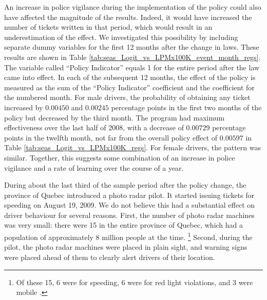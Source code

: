 An increase in police vigilance during the implementation of the policy 
could also have affected the magnitude of the results. 
Indeed, it would have increased the number of tickets written in that period, 
which would result in an underestimation of the effect. 
% 
% 
We investigated this possibility by including separate dummy variables
for the first 12 months after the change in laws. 
These results are shown in 
Table \ref{tab:seas_Logit_vs_LPMx100K_event_month_regs}. 
The variable called ``Policy Indicator'' equals 1 for the entire period after
the law came into effect. 
In each of the subsequent 12 months, the effect of the policy is measured 
as the sum of the ``Policy Indicator'' coefficient 
and the coefficient for the numbered month. 
% 
For male drivers, the probability of obtaining any ticket increased by 
$0.00450$ and $0.00245$ percentage points in the first two months of the policy
but decreased by the third month. 
The program had maximum effectiveness over the last half of 2008, 
with a decrease of $0.00729$ percentage points in the twelfth month, 
not far from the overall policy effect of $0.00597$ in 
Table \ref{tab:seas_Logit_vs_LPMx100K_regs}. 
% 
For female drivers, the pattern was similar. 
% 
Together, this suggests some combination of an increase in police vigilance 
and a rate of learning over the course of a year. 



During about the last third of the sample period after the policy change, 
the province of Quebec introduced a photo radar pilot. 
It started issuing tickets for speeding on August 19, 2009. 
We do not believe this had a substantial effect on driver behaviour for several reasons. 
First, the number of photo radar machines was very small: 
there were 15 in the entire province of Quebec, 
which had a population of approximately 8 million people at the time.%
\footnote{%
Of these 15, 6 were for speeding, 6 were for red light violations, and 3 were mobile 
\citet{bisson2020}.
}  
%
Second, during the pilot, 
the photo radar machines were placed in plain sight, 
and warning signs were placed ahead of them to clearly alert drivers of their location.

